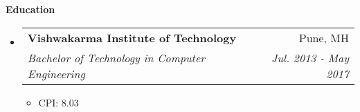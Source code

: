 \documentclass[letterpaper,12pt]{article}
\makeatletter
\newcommand{\resitem}[1]{\item #1 \vspace{-2pt}}
\newcommand{\resheading}[1]{{\large \colorbox{mygrey}{\begin{minipage}{\textwidth}{\textbf{#1 \vphantom{p\^{E}}}}\end{minipage}}}}
\newcommand{\ressubheading}[4]{
  \begin{tabular*}{7.0in}{l@{\extracolsep{\fill}}r}
    \textbf{#1} & #2 \\
    \textit{#3} & \textit{#4} \\
  \end{tabular*}\vspace{-6pt}}
\newif\ifhighschool
\makeatother
\begin{document}
\resheading{Education}
\begin{itemize}
\item
  \ressubheading{Vishwakarma Institute of Technology}{Pune, MH}{Bachelor of Technology in Computer Engineering}{Jul. 2013 - May 2017}
  \begin{itemize}
    \resitem{CPI: 8.03}
  \end{itemize}
  \ifhighschool	
\item
  \ressubheading{Delhi Public School}{Pune, MH}{12th Grade CBSE}{May 2013}
  \begin{itemize}
    \resitem{Percentage: 76.4\%}
  \end{itemize}
\item
  \ressubheading{Delhi Public School}{Pune, MH}{10th Grade CBSE}{May 2011}
  \begin{itemize}
    \resitem{CGPA: 8.6}
  \end{itemize}
  \fi
\end{itemize}

\ifhighschool
\pagebreak
\fi
\end{document}
